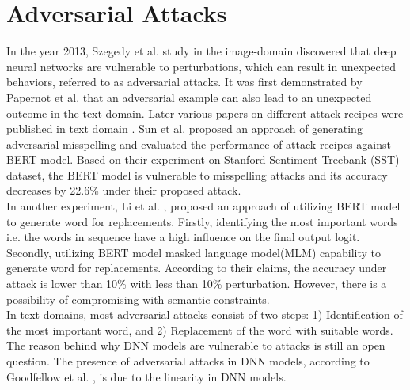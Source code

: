 \documentclass[%
	BCOR=8mm, %
	DIV=12,
	toc=bibliography, %
	toc=listof, %
	oneside, %
	egregdoesnotlikesansseriftitles, %
	]{scrbook}
\begin{document}
\section{Adversarial Attacks}
\label{section:advattacks}
In the year 2013, Szegedy et al. \cite{szegedy_intriguing_2014} study in the image-domain discovered that deep neural networks are vulnerable to perturbations, which can result in unexpected behaviors, referred to as adversarial attacks. It was first demonstrated by Papernot et al.  \cite{papernot_crafting_2016} that an adversarial example can also lead to an unexpected outcome in the text domain. Later various papers on different attack recipes were published in text domain \cite{alzantot_generating_2018,li_bert-attack_2020,gao_black-box_2018,li_bert-attack_2020,ren_generating_2019,garg_bae_2020,chen_robustness_2019}.  Sun et al.  \cite{sun_adv-bert_2020} proposed an approach of  generating adversarial misspelling and evaluated the performance of  attack recipes  against BERT model. Based on their experiment on Stanford Sentiment Treebank (SST) dataset, the BERT model is vulnerable to misspelling attacks and its accuracy decreases by 22.6\% under their proposed attack.\\
In another experiment, Li et al. \cite{li_bert-attack_2020}, proposed an approach of utilizing BERT model to generate word for replacements. Firstly, identifying the most important words i.e. the words in sequence have a high influence on the final output logit. Secondly, utilizing BERT model masked language model(MLM) capability to generate word for replacements. According to their claims, the accuracy under attack is lower than 10\% with less than 10\% perturbation. However, there is a possibility of compromising with semantic constraints.\\
In text domains, most adversarial attacks consist of two steps: 1) Identification of the most important word, and 2) Replacement of the word with suitable words. The reason behind why DNN models are vulnerable to attacks is still an open question. The presence of adversarial attacks in DNN models, according to Goodfellow et al. \cite{goodfellow_explaining_2015}, is due to the linearity in DNN models.
\end{document}
